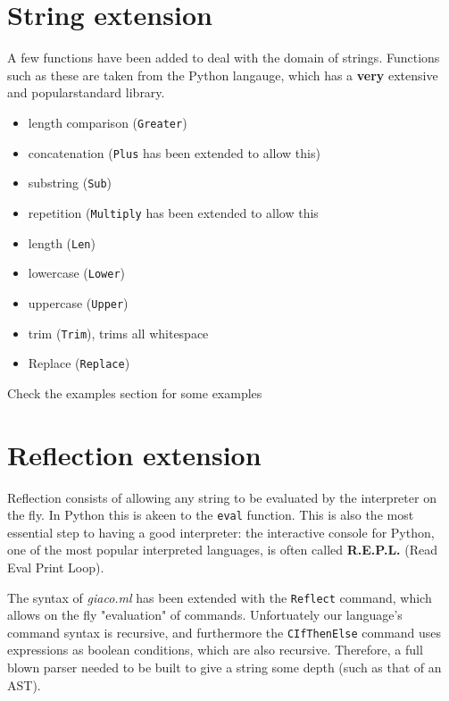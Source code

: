 \documentclass[11pt]{article}
\begin{document}
\section{String extension}
\label{sec:org3b1137a}
A few functions have been added to deal with the domain of strings.
Functions such as these are taken from the Python langauge, which has a \textbf{very} extensive and popularstandard library.
\begin{itemize}
\item length comparison (\texttt{Greater})
\item concatenation (\texttt{Plus} has been extended to allow this)
\item substring (\texttt{Sub})
\item repetition (\texttt{Multiply} has been extended to allow this
\item length (\texttt{Len})
\item lowercase (\texttt{Lower})
\item uppercase (\texttt{Upper})
\item trim (\texttt{Trim}), trims all whitespace
\item Replace (\texttt{Replace})
\end{itemize}

Check the examples section for some examples
\section{Reflection extension}
\label{sec:orgf2540dc}
Reflection consists of allowing any string to be evaluated by the interpreter on the fly. In Python this is akeen to the \texttt{eval} function.
This is also the most essential step to having a good interpreter: the interactive console for Python,
 one of the most popular interpreted languages, is often called \textbf{R.E.P.L.} (Read Eval Print Loop).

The syntax of \emph{giaco.ml} has been extended with the \texttt{Reflect} command, which allows on the fly "evaluation" of commands.
Unfortuately our language's command syntax is recursive, and furthermore the \texttt{CIfThenElse} command
uses expressions as boolean conditions, which are also recursive.
Therefore, a full blown parser needed to be built to give a string some depth (such as that of an AST).
\end{document}
